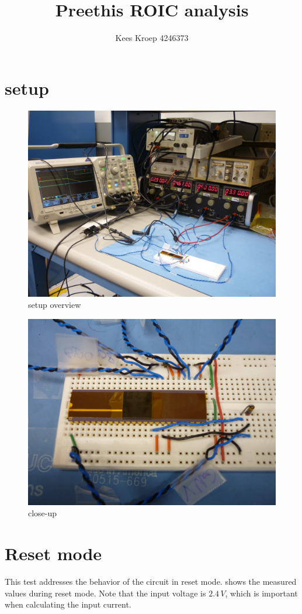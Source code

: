 \documentclass{article}
\title{Preethis ROIC analysis}
\author{Kees Kroep 4246373}
\begin{document}
  \maketitle

\section{setup}\label{sec:setup}



\begin{figure}[h]
	\centering
	\includegraphics[width=0.6\linewidth]{fig/P1010158.JPG}
	\caption{setup overview}
	\label{fig:setup_overview}
\end{figure}

\begin{figure}[h]
	\centering
	\includegraphics[width=0.6\linewidth]{fig/P1010159.JPG}
	\caption{close-up}
	\label{fig:close-up}
\end{figure}

\clearpage

\section{Reset mode}
This test addresses the behavior of the circuit in reset mode.  shows the measured values during reset mode. Note that the input voltage is $2.4\,V$, which is important when calculating the input current. 
\end{document}
